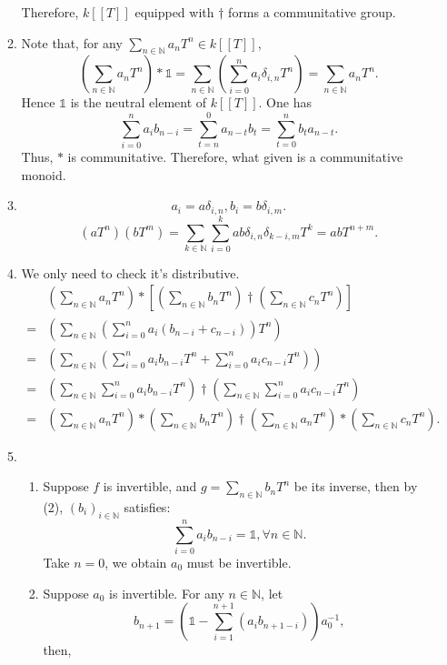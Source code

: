 \documentclass[12pt]{article}
\newcommand{\NN}{\mathbb{N}}
\begin{document}
\begin{enumerate}
\begin{enumerate}
            Therefore, $k[[T]]$ equipped with $\dagger$ forms a communitative group.
            \item Note that, for any $\sum_{n\in \NN}a_nT^n\in k[[T]]$,
            $$\left(\sum_{n\in \NN}a_nT^n\right)*\mathds{1}=\sum_{n\in \NN}\left(\sum_{i=0}^{n}a_i\delta_{i,n}T^{n}\right)=\sum_{n\in \NN}a_nT^n.$$
            Hence $\mathds{1}$ is the neutral element of $k[[T]]$. One has 
            $$\sum_{i=0}^{n}a_ib_{n-i}=\sum_{t=n}^{0}a_{n-t}b_t=\sum_{t=0}^{n}b_ta_{n-t}.$$
            Thus, $*$ is communitative. Therefore, what given is a communitative monoid.
            \item $$a_i=a\delta_{i,n}, b_i=b\delta_{i,m}.$$
                $$(aT^n)(bT^m)=\sum_{k\in \NN}\sum_{i=0}^{k}ab\delta_{i,n}\delta_{k-i,m}T^k=abT^{n+m}.$$
            \item We only need to check it's distributive.
                \begin{align*}
                     &\left(\sum_{n\in \NN}a_nT^n\right)*\left[\left(\sum_{n\in \NN}b_nT^n\right)\dagger\left(\sum_{n\in \NN}c_nT^n\right)\right]\\
                    =&\left(\sum_{n\in \NN}\left(\sum_{i=0}^{n}a_i(b_{n-i}+c_{n-i})\right)T^n\right)\\
                    =&\left(\sum_{n\in \NN}\left(\sum_{i=0}^{n}a_ib_{n-i}T^n+\sum_{i=0}^{n}a_ic_{n-i}T^n\right)\right)\\
                    =&\left(\sum_{n\in \NN}\sum_{i=0}^{n}a_ib_{n-i}T^n\right)\dagger\left(\sum_{n\in \NN}\sum_{i=0}^{n}a_ic_{n-i}T^n\right)\\
                    =&\left(\sum_{n\in \NN}a_nT^n\right)*\left(\sum_{n\in \NN}b_nT^n\right)\dagger\left(\sum_{n\in \NN}a_nT^n\right)*\left(\sum_{n\in \NN}c_nT^n\right).
                \end{align*}
            \item 
                \begin{enumerate}
                    \item Suppose $f$ is invertible, and $\displaystyle g=\sum_{n\in \NN}b_nT^n$ be its inverse, then by (2), $(b_i)_{i\in \NN}$ satisfies:
                        $$\sum_{i=0}^{n}a_ib_{n-i}=\mathds{1},\forall n\in \NN.$$
                        Take $n=0$, we obtain $a_0$ must be invertible.
                    \item Suppose $a_0$ is invertible. For any $n\in \NN$, let 
                        $$b_{n+1}=\left(\mathds{1}-\sum_{i=1}^{n+1}(a_ib_{n+1-i})\right)a_0^{-1},$$
                        then,

\end{enumerate}
\end{enumerate}
\end{enumerate}
\end{document}
